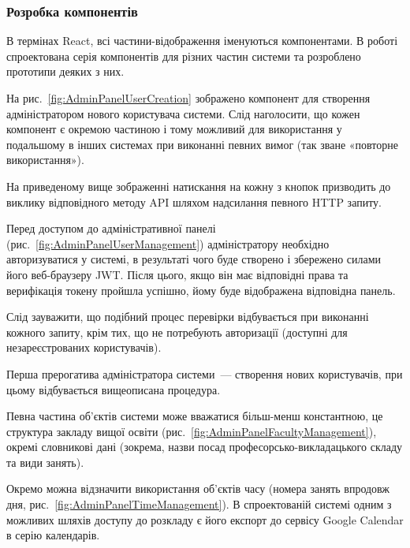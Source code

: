 \subsubsection{Розробка компонентів}

В термінах React, всі частини-відображення іменуються компонентами. В роботі спроектована серія компонентів для різних частин системи та розроблено прототипи деяких з них. 

На рис.~\ref{fig:AdminPanelUserCreation} зображено компонент для створення адміністратором нового користувача системи. Слід наголосити, що кожен компонент є окремою частиною і тому можливий для використання у подальшому в інших системах при виконанні певних вимог (так зване «повторне використання»).


На приведеному вище зображенні натискання на кожну з кнопок призводить до виклику відповідного методу API шляхом надсилання певного HTTP запиту.

Перед доступом до адміністративної панелі (рис.~\ref{fig:AdminPanelUserManagement}) адміністратору необхідно авторизуватися у системі, в результаті чого буде створено і збережено силами його веб-браузеру JWT. Після цього, якщо він має відповідні права  та верифікація токену пройшла успішно, йому буде відображена відповідна панель.


Слід зауважити, що подібний процес перевірки відбувається при виконанні кожного запиту, крім тих, що не потребують авторизації (доступні для незареєстрованих користувачів).

Перша прерогатива адміністратора системи~--- створення нових користувачів, при цьому відбувається вищеописана процедура.

Певна частина об’єктів системи може вважатися більш-менш константною, це структура закладу вищої освіти (рис.~\ref{fig:AdminPanelFacultyManagement}), окремі словникові дані (зокрема, назви посад професорсько-викладацького складу та види занять).


Окремо можна відзначити використання об’єктів часу (номера занять впродовж дня, рис.~\ref{fig:AdminPanelTimeManagement}).  В спроектованій системі одним з можливих шляхів доступу до розкладу є його експорт до сервісу Google Calendar в серію календарів. 

